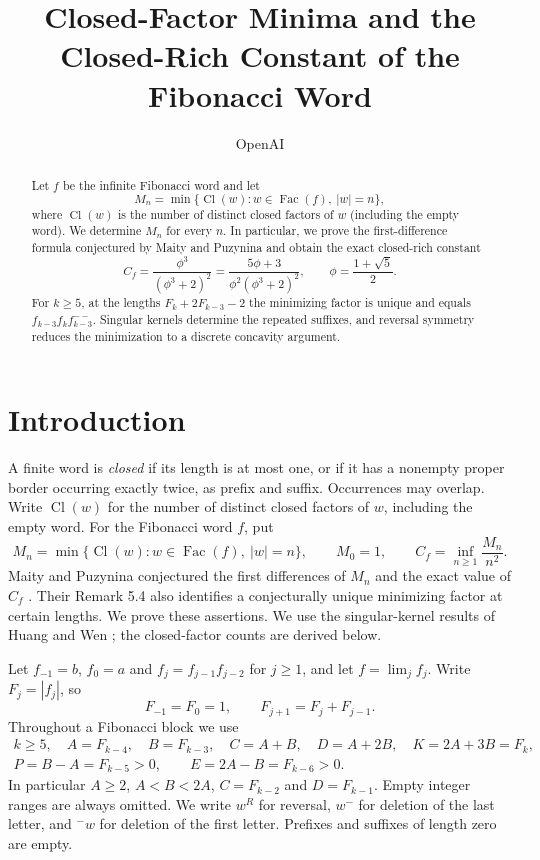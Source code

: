 \documentclass[11pt]{amsart}
\title[Closed-factor minima in the Fibonacci word]{Closed-Factor Minima and the Closed-Rich Constant of the Fibonacci Word}
\author{OpenAI}
\date{}
\newcommand{\Cl}{\operatorname{Cl}}
\newcommand{\Fac}{\operatorname{Fac}}
\begin{document}
\begin{abstract}
Let $f$ be the infinite Fibonacci word and let
\[
 M_n=\min\{\Cl(w):w\in\Fac(f),\ |w|=n\},
\]
where $\Cl(w)$ is the number of distinct closed factors of $w$ (including the empty word).  We determine $M_n$ for every $n$.  In particular, we prove the first-difference formula conjectured by Maity and Puzynina and obtain the exact closed-rich constant
\[
 C_f=\frac{\phi^3}{(\phi^3+2)^2}
     =\frac{5\phi+3}{\phi^2(\phi^3+2)^2},
 \qquad \phi=\frac{1+\sqrt5}{2}.
\]
For $k\ge5$, at the lengths $F_k+2F_{k-3}-2$ the minimizing factor is unique and equals
$f_{k-3}f_kf_{k-3}^{--}$.
Singular kernels determine the repeated suffixes, and reversal symmetry reduces the minimization to a discrete concavity argument.
\end{abstract}

\maketitle

\section{Introduction}
A finite word is \emph{closed} if its length is at most one, or if it has a
nonempty proper border occurring exactly twice, as prefix and suffix.
Occurrences may overlap.  Write $\Cl(w)$ for the number of distinct closed
factors of $w$, including the empty word.  For the Fibonacci word $f$, put
\[
 M_n=\min\{\Cl(w):w\in\Fac(f),\ |w|=n\},\qquad M_0=1,
 \qquad C_f=\inf_{n\ge1}\frac{M_n}{n^2}.
\]
Maity and Puzynina conjectured the first differences of $M_n$ and the exact
value of $C_f$ \cite[Conjectures 5.2--5.3]{MP}.  Their Remark 5.4 also
identifies a conjecturally unique minimizing factor at certain lengths.
We prove these assertions.  We use the singular-kernel results of Huang
and Wen \cite{HW}; the closed-factor counts are derived below.

Let $f_{-1}=b$, $f_0=a$ and $f_j=f_{j-1}f_{j-2}$ for $j\ge1$, and let
$f=\lim_j f_j$.  Write $F_j=|f_j|$, so
\[
 F_{-1}=F_0=1,\qquad F_{j+1}=F_j+F_{j-1}.
\]
Throughout a Fibonacci block we use
\begin{equation}\label{eq:ABCD}
 \begin{gathered}
 k\ge5,\quad A=F_{k-4},\quad B=F_{k-3},\quad C=A+B,
 \quad D=A+2B,\quad K=2A+3B=F_k,\\
 P=B-A=F_{k-5}>0,\qquad E=2A-B=F_{k-6}>0.
 \end{gathered}
\end{equation}
In particular $A\ge2$, $A<B<2A$, $C=F_{k-2}$ and $D=F_{k-1}$.
Empty integer ranges are always omitted.  We write $w^R$ for reversal,
$w^-$ for deletion of the last letter, and ${}^-w$ for deletion of the
first letter.  Prefixes and suffixes of length zero are empty.
\end{document}
